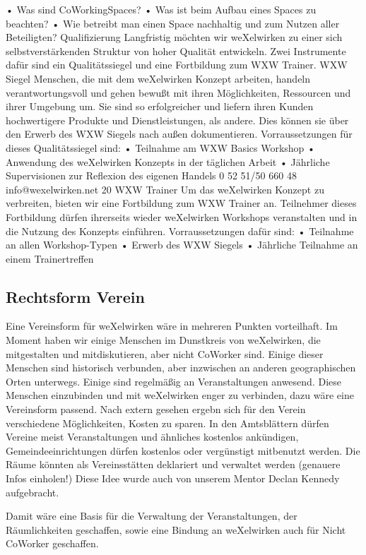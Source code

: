 •
Was sind CoWorkingSpaces?
•
Was ist beim Aufbau eines Spaces zu beachten?
•
Wie betreibt man einen Space nachhaltig und zum Nutzen aller Beteiligten?
Qualifizierung
Langfristig möchten wir weXelwirken zu einer sich selbstverstärkenden Struktur von hoher Qualität 
entwickeln. Zwei Instrumente dafür sind ein Qualitätssiegel und eine Fortbildung zum WXW Trainer.
WXW Siegel
Menschen, die mit dem weXelwirken Konzept arbeiten, handeln verantwortungsvoll und gehen bewußt 
mit ihren Möglichkeiten, Ressourcen und ihrer Umgebung um. Sie sind so erfolgreicher und liefern 
ihren Kunden hochwertigere Produkte und Dienstleistungen, als andere. Dies können sie über den 
Erwerb des WXW Siegels nach außen dokumentieren. Vorraussetzungen für dieses Qualitätssiegel sind:
•
Teilnahme am WXW Basics Workshop
•
Anwendung des weXelwirken Konzepts in der täglichen Arbeit
•
Jährliche Supervisionen zur Reflexion des eigenen Handels   
0 52 51/50 660 48
info@wexelwirken.net
20
WXW Trainer
Um das weXelwirken Konzept zu verbreiten, bieten wir eine Fortbildung zum WXW Trainer an. 
Teilnehmer dieses Fortbildung dürfen ihrerseits wieder weXelwirken Workshops veranstalten und in die 
Nutzung des Konzepts einführen. Vorraussetzungen dafür sind:
•
Teilnahme an allen Workshop-Typen
•
Erwerb des WXW Siegels
•
Jährliche Teilnahme an einem Trainertreffen
    \subsection{Rechtsform Verein}
Eine Vereinsform für weXelwirken wäre in mehreren Punkten vorteilhaft.
%
Im Moment haben wir einige Menschen im Dunstkreis von weXelwirken, die mitgestalten und mitdiskutieren, aber nicht CoWorker sind.
%
Einige dieser Menschen sind historisch verbunden, aber inzwischen an anderen geographischen Orten unterwegs.
%
Einige sind regelmäßig an Veranstaltungen anwesend.
%
Diese Menschen einzubinden und mit weXelwirken enger zu verbinden, dazu wäre eine Vereinsform passend.
%
Nach extern gesehen ergebn sich für den Verein verschiedene Möglichkeiten, Kosten zu sparen.
%
In den Amtsblättern dürfen Vereine meist Veranstaltungen und ähnliches kostenlos ankündigen, Gemeindeeinrichtungen dürfen kostenlos oder vergünstigt mitbenutzt werden.
%
Die Räume könnten als Vereinsstätten deklariert und verwaltet werden (genauere Infos einholen!)
%
Diese Idee wurde auch von unserem Mentor Declan Kennedy aufgebracht.



Damit wäre eine Basis für die Verwaltung der Veranstaltungen, der Räumlichkeiten geschaffen, sowie eine Bindung an weXelwirken auch für Nicht CoWorker geschaffen.



